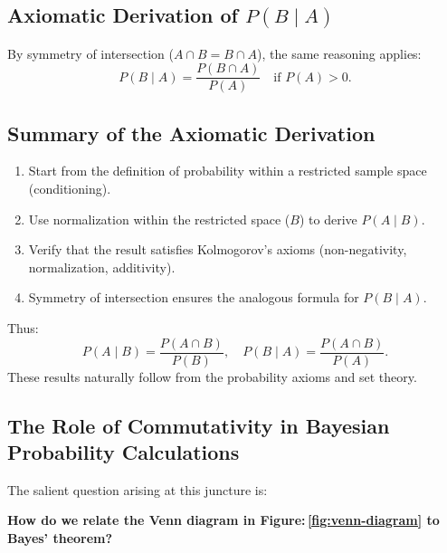 \documentclass[
  12 pt,
  a4paper,
]{book}
\providecommand{\tightlist}{%
  \setlength{\itemsep}{0pt}\setlength{\parskip}{0pt}}
\numberwithin{equation}{section}
\theoremstyle{plain}      %
\theoremstyle{definition} %
\theoremstyle{remark}     %
\theoremstyle{note}         %
\begin{document}
\hypertarget{axiomatic-derivation-of-pb-mid-a}{%
\subsection{\texorpdfstring{Axiomatic Derivation of
\(P(B \mid A)\)}{Axiomatic Derivation of P(B \textbackslash mid A)}}\label{axiomatic-derivation-of-pb-mid-a}}

By symmetry of intersection (\(A \cap B = B \cap A\)), the same
reasoning applies: \[
P(B \mid A) = \frac{P(B \cap A)}{P(A)} \quad \text{if } P(A) > 0.
\]

\hypertarget{summary-of-the-axiomatic-derivation}{%
\subsection{Summary of the Axiomatic
Derivation}\label{summary-of-the-axiomatic-derivation}}

\begin{enumerate}
\def\labelenumi{\arabic{enumi}.}
\tightlist
\item
  Start from the definition of probability within a restricted sample
  space (conditioning).
\item
  Use normalization within the restricted space (\(B\)) to derive
  \(P(A \mid B)\).
\item
  Verify that the result satisfies Kolmogorov's axioms (non-negativity,
  normalization, additivity).
\item
  Symmetry of intersection ensures the analogous formula for
  \(P(B \mid A)\).
\end{enumerate}

Thus: \[
P(A \mid B) = \frac{P(A \cap B)}{P(B)}, \quad P(B \mid A) = \frac{P(A \cap B)}{P(A)}.
\] These results naturally follow from the probability axioms and set
theory.

\newpage

\hypertarget{the-role-of-commutativity-in-bayesian-probability-calculations}{%
\subsection{The Role of Commutativity in Bayesian Probability
Calculations}\label{the-role-of-commutativity-in-bayesian-probability-calculations}}

The salient question arising at this juncture is:

\textbf{How do we relate the Venn diagram in
Figure:\(\,\)\ref{fig:venn-diagram} to Bayes' theorem?}
\end{document}
